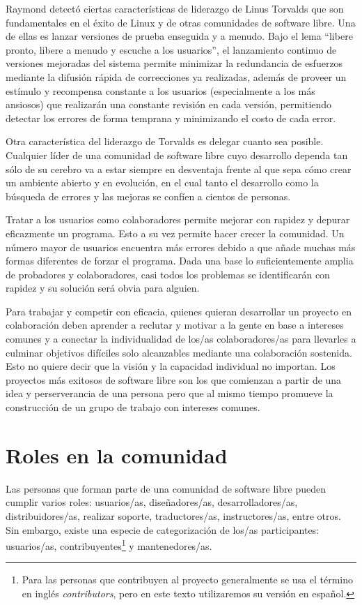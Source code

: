 Raymond detectó ciertas características de liderazgo de Linus Torvalds que son fundamentales en el éxito de Linux y de otras comunidades de software libre. Una de ellas es lanzar versiones de prueba enseguida y a menudo. Bajo el lema ``libere pronto, libere a menudo y escuche a los usuarios'', el lanzamiento continuo de versiones mejoradas del sistema permite minimizar la redundancia de esfuerzos mediante la difusión rápida de correcciones ya realizadas, además de proveer un estímulo y recompensa constante a los usuarios (especialmente a los más ansiosos) que realizarán una constante revisión en cada versión, permitiendo detectar los errores de forma temprana y minimizando el costo de cada error.

Otra característica del liderazgo de Torvalds es delegar cuanto sea posible. Cualquier líder de una comunidad de software libre cuyo desarrollo dependa tan sólo de su cerebro va a estar siempre en desventaja frente al que sepa cómo crear un ambiente abierto y en evolución, en el cual tanto el desarrollo como la búsqueda de errores y las mejoras se confíen a cientos de personas.  

Tratar a los usuarios como colaboradores permite mejorar con rapidez y depurar eficazmente un programa. Esto a su vez permite hacer crecer la comunidad. Un número mayor de usuarios encuentra más errores debido a que añade muchas más formas diferentes de forzar el programa. Dada una base lo suficientemente amplia de probadores y colaboradores, casi todos los problemas se identificarán con rapidez y su solución será obvia para alguien.  

Para trabajar y competir con eficacia, quienes quieran desarrollar un proyecto en colaboración deben aprender a reclutar y motivar a la gente en base a intereses comunes y a conectar la individualidad de los/as colaboradores/as para llevarles a culminar objetivos difíciles solo alcanzables mediante una colaboración sostenida. Esto no quiere decir que la visión y la capacidad individual no importan. Los proyectos más exitosos de software libre son los que comienzan a partir de una idea y perserverancia de una persona pero que al mismo tiempo promueve la construcción de un grupo de trabajo con intereses comunes. 

\section{Roles en la comunidad}

Las personas que forman parte de una comunidad de software libre pueden cumplir varios roles: usuarios/as, diseñadores/as, desarrolladores/as, distribuidores/as, realizar soporte, traductores/as, instructores/as, entre otros. Sin embargo, existe una especie de categorización de los/as participantes: usuarios/as, contribuyentes\footnote{Para las personas que contribuyen al proyecto generalmente se usa el término en inglés \emph{contributors}, pero en este texto utilizaremos su versión en español.} y mantenedores/as. 

